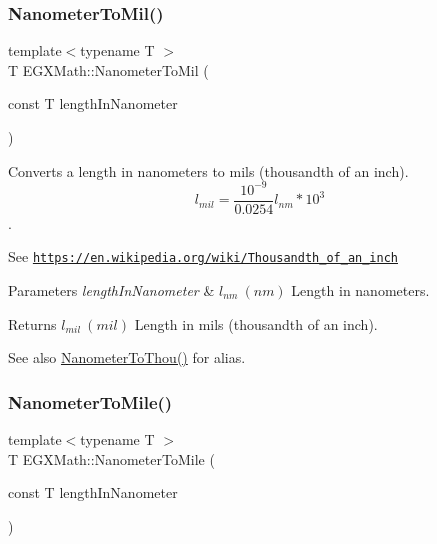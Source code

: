 \subsubsection{\texorpdfstring{Nanometer\+To\+Mil()}{NanometerToMil()}}
{\footnotesize\ttfamily template$<$typename T $>$ \\
T E\+G\+X\+Math\+::\+Nanometer\+To\+Mil (\begin{DoxyParamCaption}\item[{const T}]{length\+In\+Nanometer }\end{DoxyParamCaption})}



Converts a length in nanometers to mils (thousandth of an inch). \[ l_{mil}= \frac{10^{-9}}{0.0254} l_{nm} * 10^{3} \]. 

See \href{https://en.wikipedia.org/wiki/Thousandth_of_an_inch}{\tt https\+://en.\+wikipedia.\+org/wiki/\+Thousandth\+\_\+of\+\_\+an\+\_\+inch} 
\begin{DoxyParams}{Parameters}
{\em length\+In\+Nanometer} & $ l_{nm}\ (nm)$ Length in nanometers. \\
\hline
\end{DoxyParams}
\begin{DoxyReturn}{Returns}
$ l_{mil}\ (mil)$ Length in mils (thousandth of an inch). 
\end{DoxyReturn}
\begin{DoxySeeAlso}{See also}
\mbox{\hyperlink{group___e_g_x_math-_conversions-_length_conversions-_s_i-_nanometer-_imperial_ga4c714a8d3ab333da358dafe181ebdcc4}{Nanometer\+To\+Thou()}} for alias. 
\end{DoxySeeAlso}
\mbox{\label{group___e_g_x_math-_conversions-_length_conversions-_s_i-_nanometer-_imperial_gadbf1e269e14b8afcd128aa5534f28a5e}} 
\subsubsection{\texorpdfstring{Nanometer\+To\+Mile()}{NanometerToMile()}}
{\footnotesize\ttfamily template$<$typename T $>$ \\
T E\+G\+X\+Math\+::\+Nanometer\+To\+Mile (\begin{DoxyParamCaption}\item[{const T}]{length\+In\+Nanometer }\end{DoxyParamCaption})}



